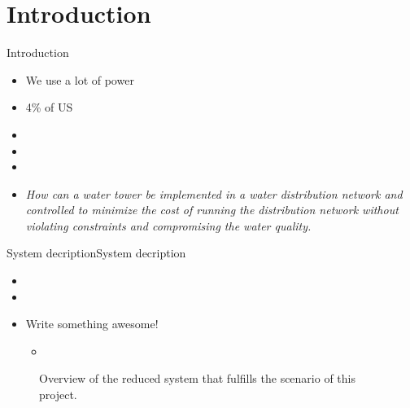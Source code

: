 \section{Introduction}

\begin{frame}{Introduction}{}
    \begin{itemize}            
	\item<1-> We use a lot of power 
	\item<1-> 4\% of US 
	\item<1-> 
	\item<1-> 
	\item<1-> 
		\item<1-> \textit{How can a water tower be implemented in a water distribution network and controlled to minimize the cost of running the distribution network without violating constraints and compromising the water quality.}
    \end{itemize}           
\end{frame}



\begin{frame}{System decription}{System decription}
 \begin{itemize}            
	\item<1->
	\item<1-> 
	\item<1-> Write something awesome!
		\begin{itemize}  
		\item<1->   
		\end{itemize}  
    \end{itemize} 
\begin{figure}[H]
\centering
 
\caption{Overview of the reduced system that fulfills the scenario of this project.}
\label{fig:sys_model_overview}
\end{figure}\vspace{-0.5cm}

\end{frame}